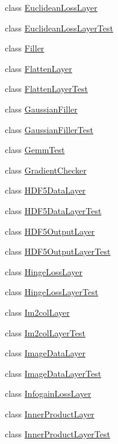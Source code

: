 \begin{DoxyCompactItemize}
class \hyperlink{classcaffe_1_1_euclidean_loss_layer}{Euclidean\+Loss\+Layer}
\item 
class \hyperlink{classcaffe_1_1_euclidean_loss_layer_test}{Euclidean\+Loss\+Layer\+Test}
\item 
class \hyperlink{classcaffe_1_1_filler}{Filler}
\item 
class \hyperlink{classcaffe_1_1_flatten_layer}{Flatten\+Layer}
\item 
class \hyperlink{classcaffe_1_1_flatten_layer_test}{Flatten\+Layer\+Test}
\item 
class \hyperlink{classcaffe_1_1_gaussian_filler}{Gaussian\+Filler}
\item 
class \hyperlink{classcaffe_1_1_gaussian_filler_test}{Gaussian\+Filler\+Test}
\item 
class \hyperlink{classcaffe_1_1_gemm_test}{Gemm\+Test}
\item 
class \hyperlink{classcaffe_1_1_gradient_checker}{Gradient\+Checker}
\item 
class \hyperlink{classcaffe_1_1_h_d_f5_data_layer}{H\+D\+F5\+Data\+Layer}
\item 
class \hyperlink{classcaffe_1_1_h_d_f5_data_layer_test}{H\+D\+F5\+Data\+Layer\+Test}
\item 
class \hyperlink{classcaffe_1_1_h_d_f5_output_layer}{H\+D\+F5\+Output\+Layer}
\item 
class \hyperlink{classcaffe_1_1_h_d_f5_output_layer_test}{H\+D\+F5\+Output\+Layer\+Test}
\item 
class \hyperlink{classcaffe_1_1_hinge_loss_layer}{Hinge\+Loss\+Layer}
\item 
class \hyperlink{classcaffe_1_1_hinge_loss_layer_test}{Hinge\+Loss\+Layer\+Test}
\item 
class \hyperlink{classcaffe_1_1_im2col_layer}{Im2col\+Layer}
\item 
class \hyperlink{classcaffe_1_1_im2col_layer_test}{Im2col\+Layer\+Test}
\item 
class \hyperlink{classcaffe_1_1_image_data_layer}{Image\+Data\+Layer}
\item 
class \hyperlink{classcaffe_1_1_image_data_layer_test}{Image\+Data\+Layer\+Test}
\item 
class \hyperlink{classcaffe_1_1_infogain_loss_layer}{Infogain\+Loss\+Layer}
\item 
class \hyperlink{classcaffe_1_1_inner_product_layer}{Inner\+Product\+Layer}
\item 
class \hyperlink{classcaffe_1_1_inner_product_layer_test}{Inner\+Product\+Layer\+Test}

\end{DoxyCompactItemize}
